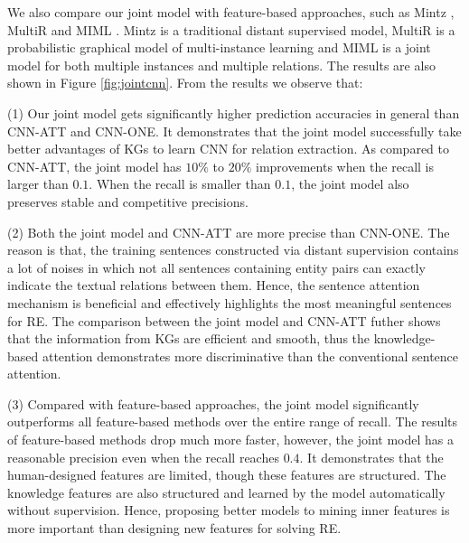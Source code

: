 \documentclass[11pt,a4paper]{article}
\begin{document}
We also compare our joint model with feature-based approaches, such as Mintz \cite{mintz2009distant}, MultiR \cite{hoffmann2011knowledge} and MIML \cite{surdeanu2012multi}. Mintz is a traditional distant supervised model, MultiR is a probabilistic graphical model of multi-instance learning and MIML is a joint model for both multiple instances and multiple relations. The results are also shown in Figure \ref{fig:jointcnn}. From the results we observe that: 

(1) Our joint model gets significantly higher prediction accuracies in general than CNN-ATT and CNN-ONE. It demonstrates that the joint model successfully take better advantages of KGs to learn CNN for relation extraction. As compared to CNN-ATT, the joint model has $10\%$ to $20\%$ improvements when the recall is larger than $0.1$. When the recall is smaller than $0.1$, the joint model also preserves stable and competitive precisions.

(2) Both the joint model and CNN-ATT are more precise than CNN-ONE. The reason is that, the training sentences constructed via distant supervision contains a lot of noises in which not all sentences containing entity pairs can exactly indicate the textual relations between them. Hence, the sentence attention mechanism is beneficial and effectively highlights the most meaningful sentences for RE. The comparison between the joint model and CNN-ATT futher shows that the information from KGs are efficient and smooth, thus the knowledge-based attention demonstrates more discriminative than the conventional sentence attention.

(3) Compared with feature-based approaches, the joint model significantly outperforms all feature-based methods over the entire range of recall. The results of feature-based methods drop much more faster, however, the joint model has a reasonable precision even when the recall reaches $0.4$. It demonstrates that the human-designed features are limited, though these features are structured. The knowledge features are also structured and learned by the model automatically without supervision. Hence, proposing better models to mining inner features is more important than designing new features for solving RE.
\end{document}
